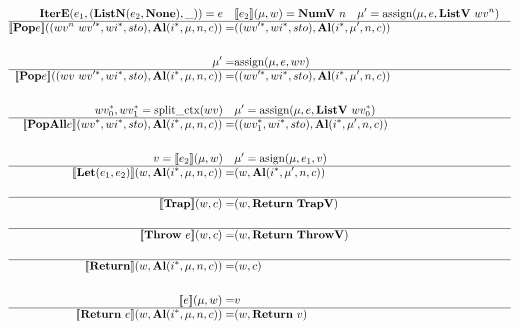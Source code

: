 \begin{align*}
%
\newline \\
  \textbf{IterE}(e_1, (\textbf{ListN}(e_2, \textbf{None}), \_))=e \quad&
  \sem{e_2}(\mu, w) = \textbf{NumV} ~ n \quad
  \mu' = \text{assign}(\mu, e, \textbf{ListV} ~ wv^n) \\
  \hline
  \sem{\textbf{Pop} e}((wv^n ~ \seq{wv'}, \seq{wi}, sto), \al (\seq{i}, \mu, n, c))
  =&
  ((\seq{wv'}, \seq{wi}, sto), \al (\seq{i}, \mu', n, c)) \\
%
\newline \\
  \mu' =& \text{assign}(\mu, e, wv) \\
  \hline
  \sem{\textbf{Pop} e}((wv ~ \seq{wv'}, \seq{wi}, sto), \al (\seq{i}, \mu, n, c))
  =&
  ((\seq{wv'}, \seq{wi}, sto), \al (\seq{i}, \mu', n, c)) \\
%
\newline \\
  \seq{wv_0}, \seq{wv_1} = \text{split\_ctx}(wv) \quad& \mu' = \text{assign}(\mu, e, \textbf{ListV} ~ \seq{wv_0}) \\
  \hline
  \sem{\textbf{PopAll} e}(\seq{wv}, \seq{wi}, sto), \al (\seq{i}, \mu, n, c))
  =&
  ((\seq{wv_1}, \seq{wi}, sto), \al (\seq{i}, \mu', n, c)) \\
%
\newline \\
  v = \sem{e_2}(\mu, w) \quad& \mu' = \text{asign}(\mu, e_1, v) \\
  \hline
  \sem{\textbf{Let}(e_1, e_2)}(w, \al (\seq{i}, \mu, n, c))
  =&
  (w, \al (\seq{i}, \mu', n, c)) \\
%
\newline \\
  \hline
  \sem{\textbf{Trap}}(w, c) =& (w, \ret ~ \textbf{TrapV}) \\
%
\newline \\
  \hline
  \sem{\textbf{Throw} ~ e}(w, c) =& (w, \ret ~ \textbf{ThrowV}) \\
%
\newline \\
  \hline
  \sem{\textbf{Return}}(w, \al (\seq{i}, \mu, n, c)) =& (w, c) \\
%
\newline \\
  \sem{e}(\mu, w) =& v \\
  \hline
  \sem{\textbf{Return} ~ e}(w, \al (\seq{i}, \mu, n, c)) =& (w, \ret ~ v) \\

\end{align*}
